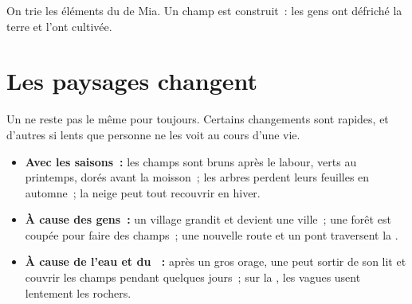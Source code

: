 \begin{omfigure}

{\small On trie les éléments du  de Mia. Un champ est construit~:
les gens ont défriché la terre et l'ont cultivée.}
\label{fig:g1:landscapes-around-us:sort}
\end{omfigure}

\section{Les paysages changent}

Un  ne reste pas le même pour toujours. Certains changements sont
rapides, et d'autres si lents que personne ne les voit au cours d'une vie.
\begin{itemize}
  \item \textbf{Avec les saisons~:} les champs sont bruns après le
        labour, verts au printemps, dorés avant la moisson~; les arbres
        perdent leurs feuilles en automne~; la neige peut tout recouvrir en
        hiver.
  \item \textbf{À cause des gens~:} un village grandit et devient une
        ville~; une forêt est coupée pour faire des champs~; une nouvelle
        route et un pont traversent la .
  \item \textbf{À cause de l'eau et du ~:} après un gros
        orage, une  peut sortir de son lit et couvrir les champs
        pendant quelques jours~; sur la , les vagues usent lentement
        les rochers.
\end{itemize}

